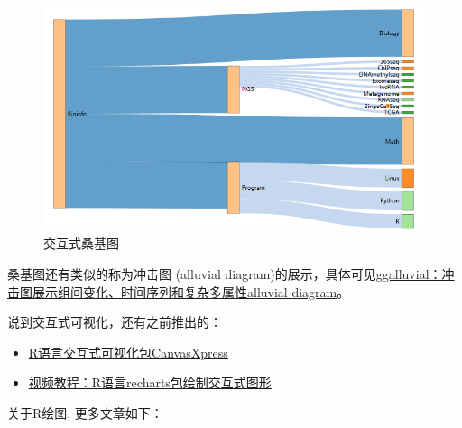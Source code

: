 \documentclass[]{article}
\providecommand{\tightlist}{%
  \setlength{\itemsep}{0pt}\setlength{\parskip}{0pt}}
\numberwithin{figure}{section}
\numberwithin{table}{section}
\theoremstyle{definition}
\theoremstyle{definition}
\theoremstyle{definition}
\theoremstyle{remark}
\begin{document}
\begin{figure}[H]

{\centering \includegraphics[width=0.95\linewidth,height=0.7\textheight,keepaspectratio]{images/Sanky_train2} 

}

\caption{交互式桑基图}\label{fig:unnamed-chunk-240}
\end{figure}

桑基图还有类似的称为冲击图 (alluvial
diagram)的展示，具体可见\href{http://mp.weixin.qq.com/s/dgxgi_3PdjW5g-fOPlAe4Q}{ggalluvial：冲击图展示组间变化、时间序列和复杂多属性alluvial
diagram}。

说到交互式可视化，还有之前推出的：

\begin{itemize}
\tightlist
\item
  \href{http://mp.weixin.qq.com/s/EQ7-T66YlAYvqa33Y8z7YA}{R语言交互式可视化包CanvasXpress}
\item
  \href{https://mp.weixin.qq.com/s/XOZD4ftYLPZjM2IVLYgUpA}{视频教程：R语言recharts包绘制交互式图形}
\end{itemize}

关于R绘图, 更多文章如下：
\end{document}
